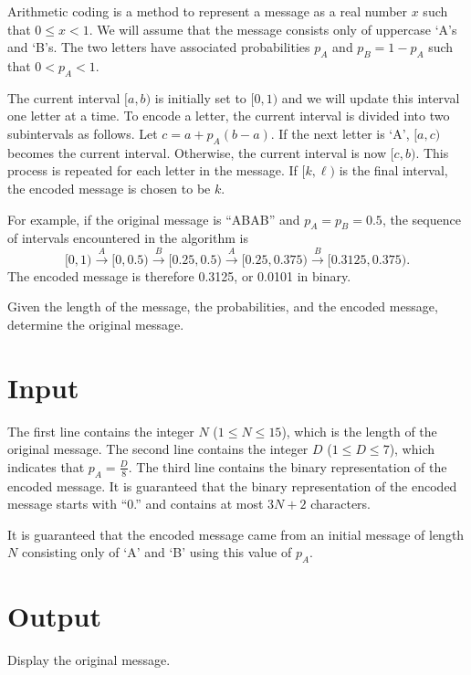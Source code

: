 
Arithmetic coding is a method to represent a message as a real number
$x$ such that $0 \leq x < 1$. We will assume that the
message consists only of uppercase `A's and `B's.  The two letters
have associated probabilities $p_A$ and $p_B = 1 - p_A$ such that
$0 < p_A < 1$.

The current interval $[a,b)$ is initially set to $[0,1)$ and we will
update this interval one letter at a time.  To encode
a letter, the current interval is divided into two subintervals
as follows.  Let $c = a + p_A(b-a)$.  If the next letter is `A',
$[a,c)$ becomes the current interval.  Otherwise, the current interval
is now $[c,b)$.  This process is repeated for each letter in the
message.  If $[k,\ell)$ is the final interval, the encoded message is
chosen to be $k$.

For example, if the original message is ``ABAB'' and $p_A = p_B = 0.5$,
the sequence of intervals encountered in the algorithm is
\[ [0,1) \xrightarrow{A} [0, 0.5) \xrightarrow{B} [0.25, 0.5)
  \xrightarrow{A} [0.25, 0.375) \xrightarrow{B} [0.3125, 0.375). \]
The encoded message is therefore 0.3125, or 0.0101 in binary.

Given the length of the message, the probabilities, and the encoded
message, determine the original message.

\section*{Input}

The first line contains the integer $N$ ($1 \leq N \leq 15$), which
is the length of the original message.  The
second line contains the integer $D$ ($1 \leq D \leq 7$),
which indicates that $p_A = \frac{D}{8}$.
The third line contains the binary representation of the encoded message.
It is guaranteed that the binary representation of the encoded message
starts with ``0.'' and contains at most $3N+2$ characters.

It is guaranteed that the encoded message came from an initial message
of length $N$ consisting only of `A' and `B' using this value of $p_A$.

\section*{Output}

Display the original message.
